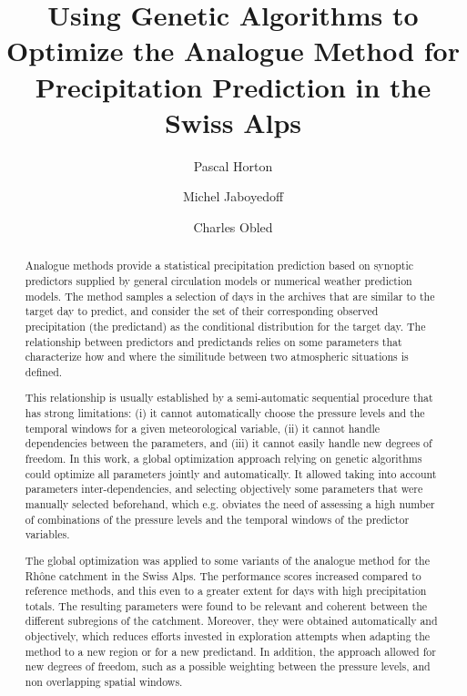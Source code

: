 \documentclass[review]{elsarticle}
\begin{document}
\begin{frontmatter}

\title{Using Genetic Algorithms to Optimize the Analogue Method for Precipitation Prediction in the Swiss Alps}

\author[unil,unibe,terranum]{Pascal Horton}

\author[unil]{Michel Jaboyedoff}
\author[lthe]{Charles Obled}

\address[unil]{University of Lausanne, Institute of Earth Sciences, Lausanne, Switzerland}
\address[unibe]{University of Bern, Oeschger Centre for Climate Change Research, Institute of Geography, Bern, Switzerland}
\address[lthe]{Universit\'{e} de Grenoble-Alpes, LTHE, Grenoble, France}

\begin{abstract}
Analogue methods provide a statistical precipitation prediction based on synoptic predictors supplied by general circulation models or numerical weather prediction models. The method samples a selection of days in the archives that are similar to the target day to predict, and consider the set of their corresponding observed precipitation (the predictand) as the conditional distribution for the target day. The relationship between predictors and predictands relies on some parameters that characterize how and where the similitude between two atmospheric situations is defined.

This relationship is usually established by a semi-automatic sequential procedure that has strong limitations: (i) it cannot automatically choose the pressure levels and the temporal windows for a given meteorological variable, (ii) it cannot handle dependencies between the parameters, and (iii) it cannot easily handle new degrees of freedom. In this work, a global optimization approach relying on genetic algorithms could optimize all parameters jointly and automatically. It allowed taking into account parameters inter-dependencies, and selecting objectively some parameters that were manually selected beforehand, which e.g. obviates the need of assessing a high number of combinations of the pressure levels and the temporal windows of the predictor variables.

The global optimization was applied to some variants of the analogue method for the Rh\^{o}ne catchment in the Swiss Alps. The performance scores increased compared to reference methods, and this even to a greater extent for days with high precipitation totals. The resulting parameters were found to be relevant and coherent between the different subregions of the catchment. Moreover, they were obtained automatically and objectively, which reduces efforts invested in exploration attempts when adapting the method to a new region or for a new predictand. In addition, the approach allowed for new degrees of freedom, such as a possible weighting between the pressure levels, and non overlapping spatial windows.
\end{abstract}


\end{frontmatter}
\end{document}
